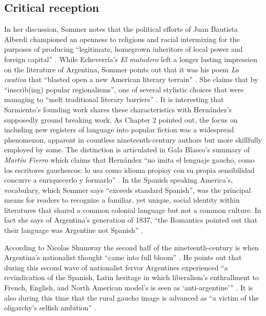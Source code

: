 \documentclass[12pt]{report}
\begin{document}
\subsection{Critical reception}
In her discussion, Sommer notes that the political efforts of Juan Bautista Alberdi championed an openness to religious and racial intermixing for the purposes of producing \enquote{legitimate, homegrown inheritors of local power and foreign capital} \autocite[103]{Sommer1991}.
While Echeverría's \textit{El matadero} left a longer lasting impression on the literature of Argentina, Sommer points out that it was his poem \textit{La cautiva} that \enquote{blasted open a new American literary terrain} \autocite[104]{Sommer1991}.
She claims that by \enquote{inscrib(ing) popular regionalisms}, one of several stylistic choices that were managing to \enquote{melt traditional literary barriers} \autocite[104]{Sommer1991}.
It is interesting that Sarmiento's founding work shares these characteristics with Hernández's supposedly ground breaking work.
As Chapter 2 pointed out, the focus on including new registers of language into popular fiction was a widespread phenomenon, apparent in countless nineteenth-century authors but more skillfully employed by some.
The distinction is articulated in Gala Blasco's summary of \textit{Martín Fierro} which claims that Hernández \enquote{no imita el lenguaje gaucho, como los escritores gauchescos: lo usa como idioma propioy con su propia sensibilidad concurre a enriquecerlo y formarlo} \autocite[400]{Blasco1991}.
In the Spanish speaking America's, vocabulary, which Sommer says \enquote{exceeds standard Spanish}, was the principal means for readers to recognize a familiar, yet unique, social identity within literatures that shared a common colonial language but not a common culture.
In fact she says of Argentina's generation of 1837, \enquote{the Romantics pointed out that their language was Argentine not Spanish} \autocite[105]{Sommer1991}.

According to Nicolas Shumway the second half of the nineteenth-century is when Argentina's nationalist thought \enquote{came into full bloom} \autocite[216]{Shumway1991}. He points out that during this second wave of nationalist fervor Argentines experienced \enquote{a revindication of the Spanish, Latin heritage in which liberalism's enthrallment to French, English, and North American model's is seen as \enquote{anti-argentine}} \autocite*[216]{Shumway1991}. It is also during this time that the rural gaucho image is advanced as \enquote{a victim of the oligarchy's selfish ambition} \autocite[216]{Shumway1991}.
\end{document}
